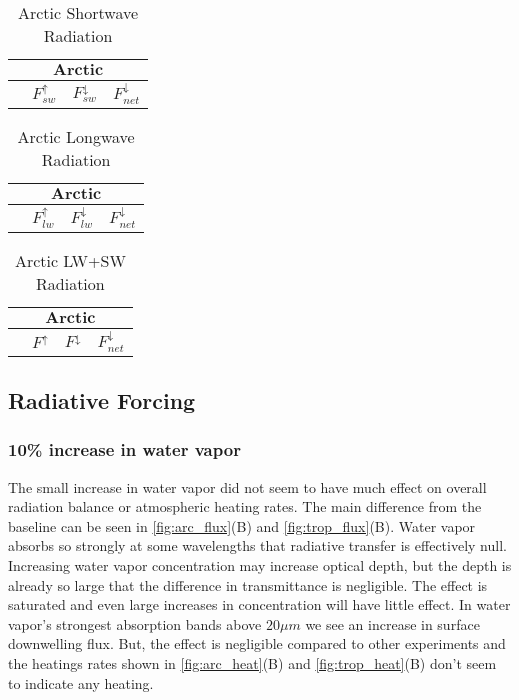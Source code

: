 \documentclass[twocol]{ametsoc}
\begin{document}
\begin{table}[h]
    \centering
    \caption{Arctic Shortwave Radiation}
    \label{tab:asr}
    \begin{tabular}{lccc}
        \toprule
        \multicolumn{4}{c}{$\textbf{Arctic}$}\\
        \midrule
        & $F^\uparrow_{sw}$ & $F^\downarrow_{sw}$ & $F^\downarrow_{net}$\\
        \midrule
        
        \bottomrule
    \end{tabular}
\end{table}

\begin{table}[h]
    \centering
    \caption{Arctic Longwave Radiation}
    \label{tab:alr}
    \begin{tabular}{lccc}
        \toprule
        \multicolumn{4}{c}{$\textbf{Arctic}$}\\
        \midrule
        & $F^\uparrow_{lw}$ & $F^\downarrow_{lw}$ & $F^\downarrow_{net}$\\
        \midrule
        
        \bottomrule
    \end{tabular}

\end{table}

\begin{table}[h]
    \centering
    \caption{Arctic LW+SW Radiation}
    \label{tab:acr}
    \begin{tabular}{lccc}
        \toprule
        \multicolumn{4}{c}{$\textbf{Arctic}$}\\
        \midrule
        & $F^\uparrow$ & $F^\downarrow$ & $F^\downarrow_{net}$\\
        \midrule
        
        \bottomrule
    \end{tabular}

\end{table}

\subsection*{Radiative Forcing}
\subsubsection{10\% increase in water vapor}
The small increase in water vapor did not seem to have much effect on overall radiation balance or atmospheric heating rates.
The main difference from the baseline can be seen in \autoref{fig:arc_flux}(B) and \autoref{fig:trop_flux}(B).
Water vapor absorbs so strongly at some wavelengths that radiative transfer is effectively null. Increasing water vapor concentration may increase optical depth, but the depth is already so large that the difference in transmittance is negligible. The effect is saturated and even large increases in concentration will have little effect. In water vapor's strongest absorption bands above $20\mu m$ we see an increase in surface downwelling flux.
But, the effect is negligible compared to other experiments and the heatings rates shown in \autoref{fig:arc_heat}(B) and \autoref{fig:trop_heat}(B) don't seem to indicate any heating.
\end{document}
